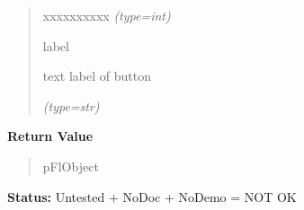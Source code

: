 \begin{boxedminipage}{\funcwidth}
\begin{quote}
\begin{Ventry}{xxxxxxxxxx}
            {\it (type=int)}

          \item[label]

          text label of button

            {\it (type=str)}

        \end{Ventry}

      \end{quote}

      \textbf{Return Value}
    \vspace{-1ex}

      \begin{quote}
      pFlObject

      \end{quote}

\textbf{Status:} Untested + NoDoc + NoDemo = NOT OK



    \end{boxedminipage}

    \label{xformslib:flbutton:fl_add_button_class}

    \vspace{0.5ex}

